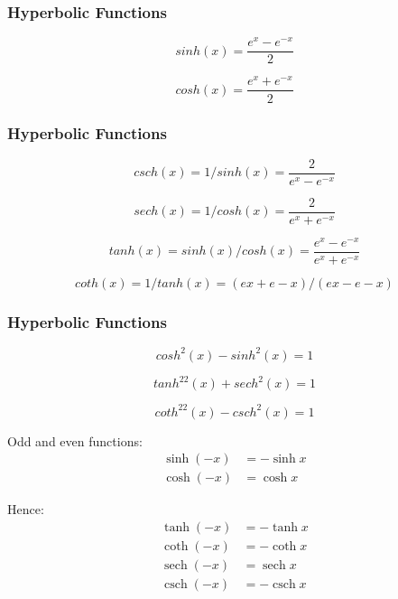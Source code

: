 \documentclass{beamer}
\begin{document}
\begin{frame}
	\frametitle{Hyperbolic Functions}

{
	\Large
\[sinh(x) =  \frac{e^x - e^{-x}}{2}\]

\[cosh(x) = \frac{e^x + e^{-x}}{2}\]
}

\end{frame}
\begin{frame}
	\frametitle{Hyperbolic Functions}

\[csch(x) = 1/sinh(x) = \frac{2}{e^x - e^{-x}}\]


\[sech(x) = 1/cosh(x) = \frac{2}{e^x + e^{-x}}\]

\[tanh(x) = sinh(x)/cosh(x) = \frac{e^x - e^{-x}}{e^x + e^{-x}}\]

\[coth(x) = 1/tanh(x) = ( ex + e-x)/( ex - e-x )\]
\end{frame}
\begin{frame}
	\frametitle{Hyperbolic Functions}

\[cosh^2(x) - sinh^2(x) = 1\]

\[tanh^22(x) + sech^2(x) = 1\]

\[coth^22(x) - csch^2(x) = 1\]
\end{frame}
\begin{frame}
Odd and even functions:
\begin{align}
\sinh (-x) &= -\sinh x \\
\cosh (-x) &=  \cosh x
\end{align}
\end{frame}

\begin{frame}
Hence:
\begin{align}
\tanh (-x) &= -\tanh x \\
\coth (-x) &= -\coth x \\
\operatorname{sech} (-x) &=  \operatorname{sech} x \\
\operatorname{csch} (-x) &= -\operatorname{csch} x
\end{align}
\end{frame}
\end{document}

